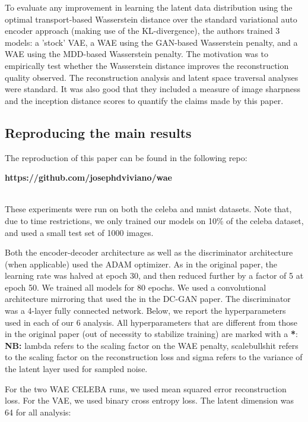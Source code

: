 \documentclass[12pt,english]{amsart}
\theoremstyle{definition}
\begin{document}
To evaluate any improvement in learning the latent data distribution using
the optimal transport-based Wasserstein distance over the standard variational
auto encoder approach (making use of the KL-divergence), the authors trained 3
models: a 'stock' VAE, a WAE using the GAN-based Wasserstein penalty, and a WAE
using the MDD-based Wasserstein penalty. The motivation was to empirically test
whether the Wasserstein distance improves the reconstruction quality observed.
The reconstruction analysis and latent space traversal analyses were standard.
It was also good that they included a measure of image sharpness and the
inception distance scores to quantify the claims made by this paper.

\subsection{Reproducing the main results}

The reproduction of this paper can be found in the following repo:\\

\begin{center}\textbf{https://github.com/josephdviviano/wae}\end{center}\\

These experiments were run on both the celeba and mnist datasets. Note that,
due to time restrictions, we only trained our models on 10\% of the celeba
dataset, and used a small test set of 1000 images.

Both the encoder-decoder architecture as well as the discriminator architecture
(when applicable) used the ADAM optimizer. As in the original paper, the
learning rate was halved at epoch 30, and then reduced further by a factor of 5
at epoch 50. We trained all models for 80 epochs. We used a convolutional
architecture mirroring that used the in the DC-GAN paper. The discriminator was
a 4-layer fully connected network. Below, we report the  hyperparameters used in
each of our 6 analysis. All hyperparameters that are different from those in the
original paper (out of necessity to stabilize training) are marked with a
\textbf{*}:\\

\textbf{NB:} lambda refers to the scaling factor on the WAE penalty,
scalebullshit refers to the scaling factor on the reconstruction loss and sigma
refers to the variance of the latent layer used for sampled noise.

For the two WAE CELEBA runs, we used mean squared error reconstruction loss.
For the VAE, we used binary cross entropy loss. The latent dimension was 64
for all analysis: \\
\end{document}
